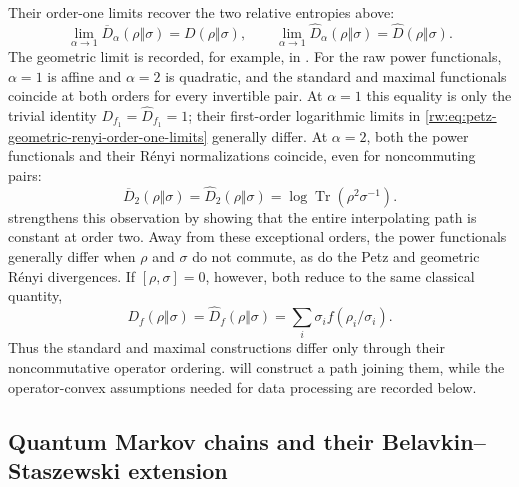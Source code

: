 \documentclass[11pt]{article}
\theoremstyle{remark}
\newcommand{\1}{\mathbbm{1}}
\begin{document}
Their order-one limits recover the two relative entropies above:
\begin{equation}
 \lim_{\alpha\to1} \overline{D}_\alpha(\rho\Vert\sigma)
 =D(\rho\Vert\sigma),
 \qquad
 \lim_{\alpha\to1}\widehat D_\alpha(\rho\Vert\sigma)
 =\widehat D(\rho\Vert\sigma).
 \label{rw:eq:petz-geometric-renyi-order-one-limits}
\end{equation}
The geometric limit is recorded, for example, in
\cite[Remark~1]{fang2021geometric}.
For the raw power functionals, $\alpha=1$ is affine and $\alpha=2$
is quadratic, and the standard and maximal functionals coincide at
both orders for every invertible pair.  At $\alpha=1$ this equality is
only the trivial identity $D_{f_1}=\widehat D_{f_1}=1$; their
first-order logarithmic limits in
\eqref{rw:eq:petz-geometric-renyi-order-one-limits} generally differ.
At $\alpha=2$, both the power functionals and their R\'enyi
normalizations coincide, even for noncommuting pairs:
\begin{equation}
 \overline D_2(\rho\Vert\sigma)
 =\widehat D_2(\rho\Vert\sigma)
 =\log\operatorname{Tr}(\rho^2\sigma^{-1}).
 \label{rw:eq:petz-geometric-renyi-quadratic-coincidence}
\end{equation}
 strengthens this observation by
showing that the entire interpolating path is constant at order two.
Away from these exceptional orders, the
power functionals generally differ when $\rho$ and $\sigma$ do not
commute, as do the Petz and geometric R\'enyi divergences.
If $[\rho,\sigma]=0$, however, both reduce to the same classical
quantity,
\begin{equation}
 D_f(\rho\Vert\sigma)
 =\widehat D_f(\rho\Vert\sigma)
 =\sum_i\sigma_i f(\rho_i/\sigma_i).
 \label{rw:eq:standard-maximal-classical-collapse}
\end{equation}
Thus the standard and maximal constructions differ only through their
noncommutative operator ordering.   will
construct a path joining them, while the operator-convex assumptions
needed for data processing are recorded below.

\subsection{Quantum Markov chains and their
Belavkin--Staszewski extension}
\label{rw:subsec:qmc-bsqmc}
\end{document}

